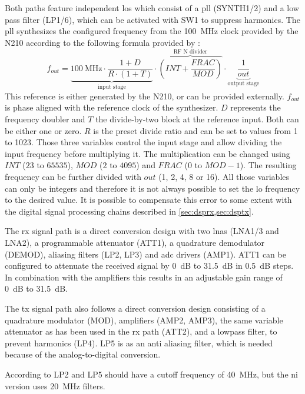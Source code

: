 \documentclass[12pt,a4paper,parskip=full,abstracton]{scrartcl}
\begin{document}
Both paths feature independent \glspl{lo} which consist of a \gls{pll} (SYNTH1/2) and a low
pass filter (LP1/6), which can be activated with SW1 to suppress harmonics\cite{flo}. The
\gls{pll} synthesizes the configured frequency from the \SI{100}{\mega\hertz} clock provided
by the N210 according to the following formula provided by \cite{synth}:
\begin{equation}
\label{eq:frequency}
f_{out} = \underbrace{\SI{100}{\mega\hertz} \cdot \frac{1 + D}{R \cdot (1 + T)}}_\text{input stage} \cdot \overbrace{\left(INT + \frac{FRAC}{MOD}\right)}^\text{RF N divider} \cdot \underbrace{\frac{1}{out}}_\text{output stage}
\end{equation}
This reference is either generated by the N210, or can be provided externally.
$f_{out}$ is phase aligned with the reference clock of the synthesizer. $D$ represents the frequency doubler
and $T$ the divide-by-two block at the reference input. Both can
be either one or zero. $R$ is the preset divide ratio and can be set to values from 1 to 1023.
Those three variables control the input stage and allow dividing the input frequency before multiplying
it. The multiplication can be changed using $INT$ ($23$ to $65535$), $MOD$ ($2$ to $4095$)
and $FRAC$ (0 to $MOD - 1$). The resulting frequency can be further divided with $out$ (1, 2, 4, 8 or 16).
All those variables can only be integers and therefore it is not always possible to set the \gls{lo}
frequency to the desired value. It is possible to compensate this error to some extent with the digital signal
processing chains described in \cref{sec:dsprx,sec:dsptx}.

The \gls{rx} signal path is a direct conversion design with two \glspl{lna} (LNA1/3 and LNA2),
a programmable attenuator (ATT1), a quadrature demodulator (DEMOD), aliasing filters (LP2, LP3)
and \gls{adc} drivers (AMP1). ATT1 can be configured to attenuate the received signal by
\SI{0}{\deci\bel} to \SI{31.5}{\deci\bel} in \SI{0.5}{\deci\bel} steps. In combination with
the amplifiers this results in an adjustable gain range of \SI{0}{\deci\bel} to \SI{31.5}{\deci\bel}.

The \gls{tx} signal path also follows a direct conversion design consisting of a quadrature
modulator (MOD), amplifiers (AMP2, AMP3), the same variable attenuator as has been used in
the \gls{rx} path (ATT2), and a lowpass filter, to prevent harmonics (LP4). LP5 is as an
anti aliasing filter, which is needed because of the analog-to-digital conversion.

According to \cite{sch_sbx} LP2 and LP5 should have a cutoff frequency of \SI{40}{\mega\hertz},
but the \gls{ni} version uses \SI{20}{\mega\hertz} filters\cite{ni_29xx}.
\end{document}
